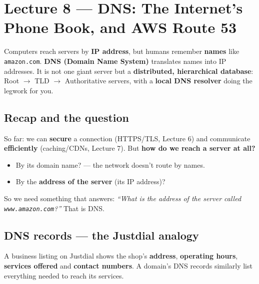 \chapter{Lecture 8 --- DNS: The Internet's Phone Book, and AWS Route 53}

\begin{keyidea}
Computers reach servers by \textbf{IP address}, but humans remember \textbf{names} like \texttt{amazon.com}. \textbf{DNS (Domain Name System)} translates names into IP addresses. It is not one giant server but a \textbf{distributed, hierarchical database}: Root $\to$ TLD $\to$ Authoritative servers, with a \textbf{local DNS resolver} doing the legwork for you.
\end{keyidea}

\section{Recap and the question}
So far: we can \textbf{secure} a connection (HTTPS/TLS, Lecture 6) and communicate \textbf{efficiently} (caching/CDNs, Lecture 7). But \textbf{how do we reach a server at all?}
\begin{itemize}
  \item By its domain name? \textcolor{cnred}{} --- the network doesn't route by names.
  \item By the \textbf{address of the server} (its IP address)? \textcolor{cngreen}{\checkmark}
\end{itemize}
So we need something that answers: \emph{``What is the address of the server called \texttt{www.amazon.com}?''} That is DNS.

\section{DNS records --- the Justdial analogy}
\begin{analogy}
A business listing on Justdial shows the shop's \textbf{address}, \textbf{operating hours}, \textbf{services offered} and \textbf{contact numbers}. A domain's DNS records similarly list everything needed to reach its services.
\end{analogy}

